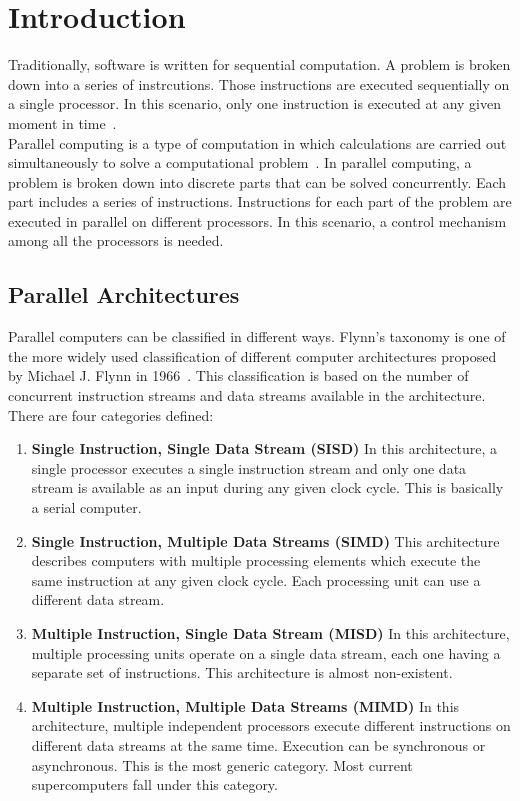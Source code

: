 \chapter{Introduction}
\label{sec:Introduction}

Traditionally, software is written for sequential computation. A problem is broken down into a series of instrcutions. Those instructions are executed sequentially on a single processor. In this scenario, only one instruction is executed at any given moment in time~\cite{barney2010introduction}.\\
Parallel computing is a type of computation in which calculations are carried out simultaneously to solve a computational problem~\cite{Almasi:1989:HPC:160438}. In parallel computing, a problem is broken down into discrete parts that can be solved concurrently. Each part includes a series of instructions. Instructions for each part of the problem are executed in parallel on different processors. In this scenario, a control mechanism among all the processors is needed.


\section{Parallel Architectures}
Parallel computers can be classified in different ways. Flynn's taxonomy is one of the more widely used classification of different computer architectures proposed by Michael J. Flynn in 1966~\cite{5009071,44900}. This classification is based on the number of concurrent instruction streams and data streams available in the architecture.
There are four categories defined:

\begin{enumerate}
\item \textbf{Single Instruction, Single Data Stream (SISD)}
    In this architecture, a single processor executes a single instruction stream and only one data stream is available as an input during any given clock cycle. This is basically a serial computer.
\item \textbf{Single Instruction, Multiple Data Streams (SIMD)}
    This architecture describes computers with multiple processing elements which execute the same instruction at any given clock cycle. Each processing unit can use a different data stream.
\item \textbf{Multiple Instruction, Single Data Stream (MISD)}
    In this architecture, multiple processing units operate on a single data stream, each one having a separate set of instructions. This architecture is almost non-existent.
\item \textbf{Multiple Instruction, Multiple Data Streams (MIMD)}
    In this architecture, multiple independent processors execute different instructions on different data streams at the same time. Execution can be synchronous or asynchronous. This is the most generic category. Most current supercomputers fall under this category.
\end{enumerate}

